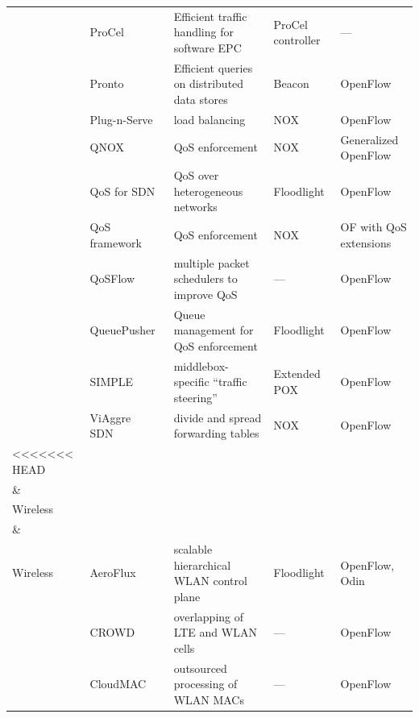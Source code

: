 {\begin{table}[!htp]
\begin{center}
\begin{tabularx}{\linewidth}{p{2cm}p{3.2cm}p{5.1cm}Xp{3.3cm}}
& {ProCel~\cite{Nagaraj2014_4}} & {Efficient traffic handling for software EPC} & {ProCel controller} & {---}\\

& {Pronto~\cite{Xiong2014pronto,Xiong2014pronto2}} & {Efficient queries on distributed data stores} & {Beacon} & {OpenFlow}\\

& Plug-n-Serve~\cite{handigol2009-1}  & load balancing             &  NOX & OpenFlow      \\
& QNOX~\cite{jeong2012}          & QoS enforcement                &  NOX & Generalized OpenFlow \\

& {QoS for SDN~\cite{Sharma2014}} & {QoS over heterogeneous networks} & {Floodlight} & {OpenFlow}\\

& QoS framework~\cite{kim2010} & QoS enforcement                &  NOX & OF with QoS extensions \\
& QoSFlow~\cite{ishimori2013} & multiple packet schedulers to improve QoS & --- & OpenFlow\\

& {QueuePusher~\cite{Palma2014}} & {Queue management for QoS enforcement} & {Floodlight} & {OpenFlow}\\

& SIMPLE~\cite{qazi2013-1}  & middlebox-specific ``traffic steering'' & Extended POX & OpenFlow  \\
& ViAggre SDN~\cite{skoldstrom2013-1} & divide and spread forwarding tables & NOX & OpenFlow\\

\hline
<<<<<<< HEAD
\multirow{10}{*}{\begin{minipage}{2cm}Mobility \\\& \\Wireless\end{minipage}} 
=======
\multirow{9}{*}{\begin{minipage}{2cm}Mobility \\\& \\Wireless\end{minipage}} 
>>>>>>> cf0efb14a6b582e806c087b3fa412b9afb5290e3
& AeroFlux~\cite{schulz-zander2014-ons,schulz-zander2014-hotsdn} & scalable hierarchical WLAN control plane & Floodlight & OpenFlow, Odin \\
& CROWD~\cite{ali-ahmad2013} & overlapping of LTE and WLAN cells & --- & OpenFlow \\
& CloudMAC~\cite{vestin2013} & outsourced processing of WLAN MACs & --- & OpenFlow \\


\end{tabularx}
\end{center}
\end{table}}
